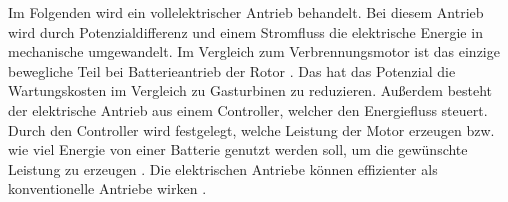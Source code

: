 Im Folgenden wird ein vollelektrischer Antrieb behandelt. 
Bei diesem Antrieb wird durch Potenzialdifferenz und einem Stromfluss die elektrische Energie in mechanische umgewandelt.
%
%
Im Vergleich zum Verbrennungsmotor ist das einzige bewegliche Teil bei Batterieantrieb der Rotor \cite{donckers2024electric}.
Das hat das Potenzial die Wartungskosten im Vergleich zu Gasturbinen zu reduzieren.
Außerdem besteht der elektrische Antrieb aus einem Controller, welcher den Energiefluss steuert. 
Durch den Controller wird festgelegt, welche Leistung der Motor erzeugen bzw. wie viel Energie von 
einer Batterie genutzt werden soll, um die gewünschte Leistung zu erzeugen \cite{donckers2024electric}. 
Die elektrischen Antriebe können effizienter als konventionelle Antriebe wirken \cite{hepperle2012electric}. %
%
